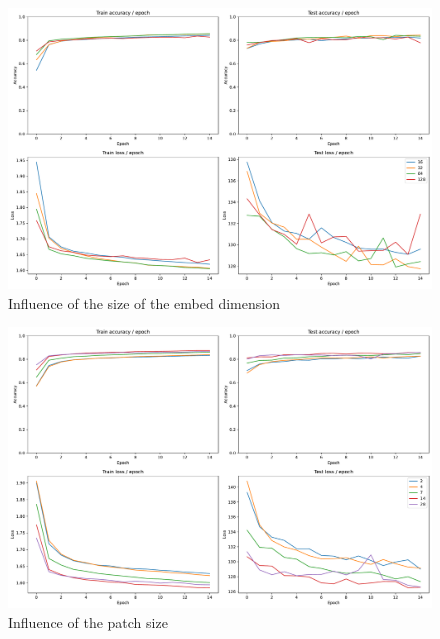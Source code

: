 \begin{figure}[H]
    \centering
    \includegraphics*[width=\textwidth]{figs/Transformers/fashion-MNIST/embed_dim_influence.pdf}
    \caption{Influence of the size of the embed dimension}
    \label{fig:embed_dim_influence}
\end{figure}

\begin{figure}[H]
    \centering
    \includegraphics*[width=\textwidth]{figs/Transformers/fashion-MNIST/patch_size_influence.pdf}
    \caption{Influence of the patch size}
    \label{fig:patch_size_influence}
\end{figure}


